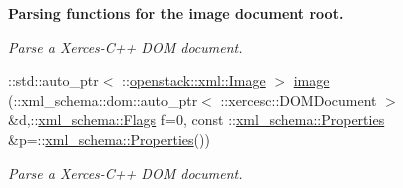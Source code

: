 \begin{Indent}{\bf Parsing functions for the image document root.}
\begin{DoxyCompactItemize}
\begin{DoxyCompactList}\small\item\em Parse a Xerces-\/C++ DOM document. \item\end{DoxyCompactList}\item 
::std::auto\_\-ptr$<$ ::\hyperlink{classopenstack_1_1xml_1_1Image}{openstack::xml::Image} $>$ \hyperlink{namespaceopenstack_1_1xml_acc1ff08f9aa5706595f8e6416d9c7ad4}{image} (::xml\_\-schema::dom::auto\_\-ptr$<$ ::xercesc::DOMDocument $>$ \&d,::\hyperlink{namespacexml__schema_affb4c227cbd9aa7453dd1dc5a1401943}{xml\_\-schema::Flags} f=0, const ::\hyperlink{namespacexml__schema_ad27ce19a7ee1d3b1064092648898f64c}{xml\_\-schema::Properties} \&p=::\hyperlink{namespacexml__schema_ad27ce19a7ee1d3b1064092648898f64c}{xml\_\-schema::Properties}())
\begin{DoxyCompactList}\small\item\em Parse a Xerces-\/C++ DOM document. \item\end{DoxyCompactList}\end{DoxyCompactItemize}
\end{Indent}
